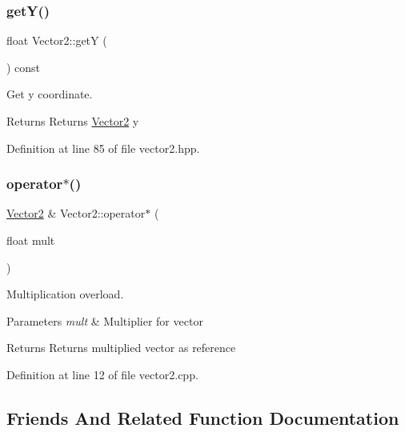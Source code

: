\subsubsection{\texorpdfstring{get\+Y()}{getY()}}
{\footnotesize\ttfamily float Vector2\+::getY (\begin{DoxyParamCaption}{ }\end{DoxyParamCaption}) const\hspace{0.3cm}{\ttfamily [inline]}}



Get y coordinate. 

\begin{DoxyReturn}{Returns}
Returns \mbox{\hyperlink{classVector2}{Vector2}} y 
\end{DoxyReturn}


Definition at line 85 of file vector2.\+hpp.

\mbox{\label{classVector2_a2b00999bdfe377965239a8f44d7c192c}} 
\subsubsection{\texorpdfstring{operator$\ast$()}{operator*()}}
{\footnotesize\ttfamily \mbox{\hyperlink{classVector2}{Vector2}} \& Vector2\+::operator$\ast$ (\begin{DoxyParamCaption}\item[{float}]{mult }\end{DoxyParamCaption})}



Multiplication overload. 


\begin{DoxyParams}{Parameters}
{\em mult} & Multiplier for vector \\
\hline
\end{DoxyParams}
\begin{DoxyReturn}{Returns}
Returns multiplied vector as reference 
\end{DoxyReturn}


Definition at line 12 of file vector2.\+cpp.



\subsection{Friends And Related Function Documentation}
\mbox{\label{classVector2_abed1d1283eebca3cc8248543d219a937}} 
